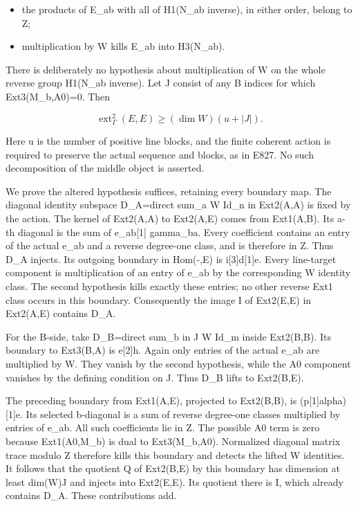 \begin{itemize}
\tightlist
\item
  the products of E\_ab with all of H1(N\_ab inverse), in either order,
  belong to Z;
\item
  multiplication by W kills E\_ab into H3(N\_ab).
\end{itemize}

There is deliberately no hypothesis about multiplication of W on the whole
reverse group H1(N\_ab inverse). Let J consist of any B indices for which
Ext3(M\_b,A0)=0. Then

\[
 \operatorname{ext}^2_\Gamma(E,E)\ge(\dim W)(u+|J|).
 \tag{E830.2}
\]

Here u is the number of positive line blocks, and the finite coherent action
is required to preserve the actual sequence and blocks, as in E827. No such
decomposition of the middle object is asserted.

We prove the altered hypothesis suffices, retaining every boundary map. The
diagonal identity subspace D\_A=direct sum\_a W Id\_n in Ext2(A,A) is fixed
by the action. The kernel of Ext2(A,A) to Ext2(A,E) comes from Ext1(A,B).
Its a-th diagonal is the sum of e\_ab{[}1{]} gamma\_ba. Every coefficient
contains an entry of the actual e\_ab and a reverse degree-one class, and is
therefore in Z. Thus D\_A injects. Its outgoing boundary in Hom(-,E) is
i{[}3{]}d{[}1{]}e. Every line-target component is multiplication of an entry
of e\_ab by the corresponding W identity class. The second hypothesis kills
exactly these entries; no other reverse Ext1 class occurs in this boundary.
Consequently the image I of Ext2(E,E) in Ext2(A,E) contains D\_A.

For the B-side, take D\_B=direct sum\_b in J W Id\_m inside Ext2(B,B). Its
boundary to Ext3(B,A) is e{[}2{]}h. Again only entries of the actual e\_ab
are multiplied by W. They vanish by the second hypothesis, while the A0
component vanishes by the defining condition on J. Thus D\_B lifts to
Ext2(B,E).

The preceding boundary from Ext1(A,E), projected to Ext2(B,B), is
(p{[}1{]}alpha){[}1{]}e. Its selected b-diagonal is a sum of reverse
degree-one classes multiplied by entries of e\_ab. All such coefficients lie
in Z. The possible A0 term is zero because Ext1(A0,M\_b) is dual to
Ext3(M\_b,A0). Normalized diagonal matrix trace modulo Z therefore kills
this boundary and detects the lifted W identities. It follows that the
quotient Q of Ext2(B,E) by this boundary has dimension at least
dim(W)\textbar J\textbar{} and injects into Ext2(E,E). Its quotient there is
I, which already contains D\_A. These contributions add.


